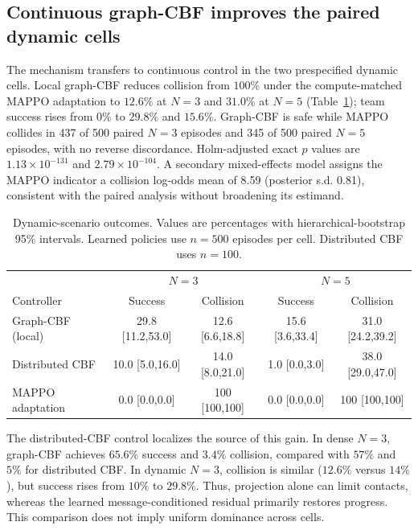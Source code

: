 \documentclass{article}
\begin{document}
\subsection{Continuous graph-CBF improves the paired dynamic cells}
The mechanism transfers to continuous control in the two prespecified dynamic cells. Local graph-CBF reduces collision from $100\%$ under the compute-matched MAPPO adaptation to $12.6\%$ at $N=3$ and $31.0\%$ at $N=5$ (Table~\ref{tab:dynamic}); team success rises from $0\%$ to $29.8\%$ and $15.6\%$. Graph-CBF is safe while MAPPO collides in 437 of 500 paired $N=3$ episodes and 345 of 500 paired $N=5$ episodes, with no reverse discordance. Holm-adjusted exact $p$ values are $1.13\times10^{-131}$ and $2.79\times10^{-104}$. A secondary mixed-effects model assigns the MAPPO indicator a collision log-odds mean of 8.59 (posterior s.d. 0.81), consistent with the paired analysis without broadening its estimand.

\begin{table}[t]
\caption{Dynamic-scenario outcomes. Values are percentages with hierarchical-bootstrap 95\% intervals. Learned policies use $n=500$ episodes per cell. Distributed CBF uses $n=100$.}
\label{tab:dynamic}
\centering
\small
\begin{tabular}{lcccc}
\toprule
& \multicolumn{2}{c}{$N=3$} & \multicolumn{2}{c}{$N=5$} \\
Controller & Success & Collision & Success & Collision \\
\midrule
Graph-CBF (local) & 29.8 [11.2,53.0] & 12.6 [6.6,18.8] & 15.6 [3.6,33.4] & 31.0 [24.2,39.2] \\
Distributed CBF & 10.0 [5.0,16.0] & 14.0 [8.0,21.0] & 1.0 [0.0,3.0] & 38.0 [29.0,47.0] \\
MAPPO adaptation & 0.0 [0.0,0.0] & 100 [100,100] & 0.0 [0.0,0.0] & 100 [100,100] \\
\bottomrule
\end{tabular}
\end{table}

The distributed-CBF control localizes the source of this gain. In dense $N=3$, graph-CBF achieves $65.6\%$ success and $3.4\%$ collision, compared with $57\%$ and $5\%$ for distributed CBF. In dynamic $N=3$, collision is similar ($12.6\%$ versus $14\%$), but success rises from $10\%$ to $29.8\%$. Thus, projection alone can limit contacts, whereas the learned message-conditioned residual primarily restores progress. This comparison does not imply uniform dominance across cells.
\end{document}
